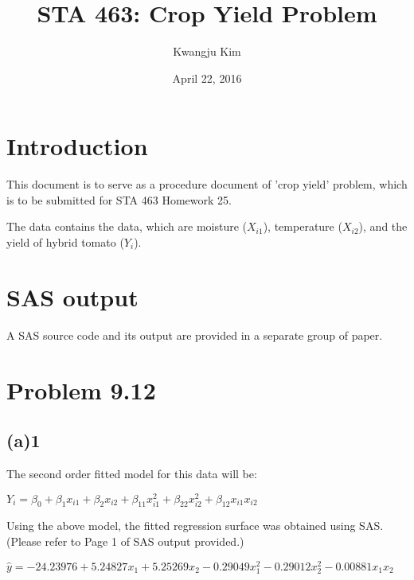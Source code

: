 \documentclass[letterpaper]{article}
\title{STA 463: Crop Yield Problem}
\author{Kwangju Kim}
\date{April 22, 2016}
\begin{document}
\maketitle

\section{Introduction}
\begin{flushleft}
This document is to serve as a procedure document of 'crop yield' problem, which is to be submitted for STA 463 Homework 25.

The data contains the data, which are moisture ($X_{i1}$), temperature ($X_{i2}$), and the yield of hybrid tomato ($Y_i$).
\end{flushleft}

\section{SAS output}
\begin{flushleft}
A SAS source code and its output are provided in a separate group of paper.
\end{flushleft}

\section{Problem 9.12}

\subsection{(a)1}
\begin{flushleft}
The second order fitted model for this data will be:
\end{flushleft}

\begin{center}
$Y_i = \beta_0 + \beta_1x_{i1} + \beta_2x_{i2} + \beta_{11}x^2_{i1} + \beta_{22}x^2_{i2} + \beta_{12}x_{i1}x_{i2}$
\end{center}

\begin{flushleft}
Using the above model, the fitted regression surface was obtained using SAS. (Please refer to Page 1 of SAS output provided.)
\end{flushleft}

\begin{center}
$\hat{y} = - 24.23976 + 5.24827x_1 + 5.25269x_2 - 0.29049x^2_1 - 0.29012x^2_2 - 0.00881x_1x_2$
\end{center}
\end{document}
